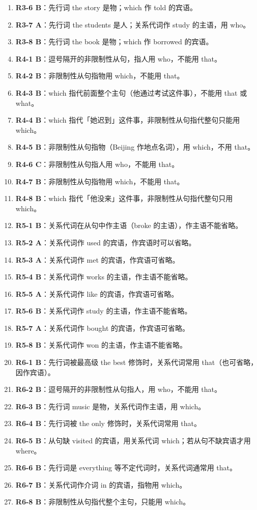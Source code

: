 \documentclass[11pt,a4paper]{ctexart}
\begin{document}
\begin{enumerate}[leftmargin=1.6em,itemsep=2pt]
\item \textbf{R3-6 B}：先行词 the story 是物；which 作 told 的宾语。
\item \textbf{R3-7 A}：先行词 the students 是人；关系代词作 study 的主语，用 who。
\item \textbf{R3-8 B}：先行词 the book 是物；which 作 borrowed 的宾语。
\item \textbf{R4-1 B}：逗号隔开的非限制性从句，指人用 who，不能用 that。
\item \textbf{R4-2 B}：非限制性从句指物用 which，不能用 that。
\item \textbf{R4-3 B}：which 指代前面整个主句（他通过考试这件事），不能用 that 或 what。
\item \textbf{R4-4 B}：which 指代「她迟到」这件事，非限制性从句指代整句只能用 which。
\item \textbf{R4-5 B}：非限制性从句指物（Beijing 作地点名词），用 which，不用 that。
\item \textbf{R4-6 C}：非限制性从句指人用 who，不能用 that。
\item \textbf{R4-7 B}：非限制性从句指物用 which，不能用 that。
\item \textbf{R4-8 B}：which 指代「他没来」这件事，非限制性从句指代整句只用 which。
\item \textbf{R5-1 B}：关系代词在从句中作主语（broke 的主语），作主语不能省略。
\item \textbf{R5-2 A}：关系代词作 used 的宾语，作宾语时可以省略。
\item \textbf{R5-3 A}：关系代词作 met 的宾语，作宾语可省略。
\item \textbf{R5-4 B}：关系代词作 works 的主语，作主语不能省略。
\item \textbf{R5-5 A}：关系代词作 like 的宾语，作宾语可省略。
\item \textbf{R5-6 B}：关系代词作 study 的主语，作主语不能省略。
\item \textbf{R5-7 A}：关系代词作 bought 的宾语，作宾语可省略。
\item \textbf{R5-8 B}：关系代词作 won 的主语，作主语不能省略。
\item \textbf{R6-1 B}：先行词被最高级 the best 修饰时，关系代词常用 that（也可省略，因作宾语）。
\item \textbf{R6-2 B}：逗号隔开的非限制性从句指人，用 who，不能用 that。
\item \textbf{R6-3 B}：先行词 music 是物，关系代词作主语，用 which。
\item \textbf{R6-4 B}：先行词被 the only 修饰时，关系代词常用 that。
\item \textbf{R6-5 B}：从句缺 visited 的宾语，用关系代词 which；若从句不缺宾语才用 where。
\item \textbf{R6-6 B}：先行词是 everything 等不定代词时，关系代词通常用 that。
\item \textbf{R6-7 B}：关系代词作介词 in 的宾语，指物用 which。
\item \textbf{R6-8 B}：非限制性从句指代整个主句，只能用 which。
\end{enumerate}
\end{document}

